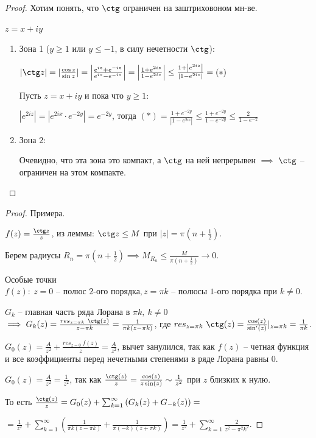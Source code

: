 \begin{proof}
    Хотим понять, что $\ctg$ ограничен на заштриховоном мн-ве.

    $z = x + iy$

    \begin{enumerate}
        \item {
            Зона 1 ($y \geq 1$ или $y \leq -1$, в силу нечетности $\ctg$):

            $|\ctg z| = |\frac{\cos z}{\sin z}| = \left|\frac{e^{iz} + e^{-iz}}{e^{iz} - e^{-iz}}\right| = \left| \frac{1 + e^{2iz}}{1 - e^{2iz}} \right| \leq  \frac{1 + \left|e^{2iz}\right|}{\left|1 - e^{2iz}\right|} = (*)$

            Пусть $z = x + iy$ и пока что $y \geq 1$:

            $|e^{2iz}| = |e^{2ix} \cdot e^{-2y}| = e^{-2y}$, тогда $(*) = \frac{1 + e^{-2y}}{|1 - e^{2iz}|} \leq \frac{1 + e^{-2y}}{1-e^{-2y}} \leq \frac{2}{1 - e^{-2}}$
        }
        \item {
            Зона 2:

            Очевидно, что эта зона это компакт, а $\ctg$ на ней непрерывен $\implies$ $\ctg$ -- ограничен на этом компакте.
        }
    \end{enumerate}
\end{proof}

\begin{proof}
    Примера.

    $f(z) = \frac{\ctg z}{z}$, из леммы: $\ctg z \leq M$ при $|z| = \pi (n + \frac{1}{2})$.

    Берем радиусы $R_n = \pi (n + \frac{1}{2}) \implies M_{R_n} \leq \frac{M}{\pi (n + \frac{1}{2})} \rightarrow 0$.

    Особые точки $f(z): \ z = 0 \text{ -- полюс 2-ого порядка}, z = \pi k \text{ -- полюсы 1-ого порядка при } k \neq 0$.

    $G_k$ -- главная часть ряда Лорана в $\pi k, \ k \neq 0$ $\implies G_k(z) = \frac{res_{z = \pi k} \ \ctg(z)}{z - \pi k} = \frac{1}{\pi k(z - \pi k)}$, где $res_{z = \pi k} \ \ctg(z) = \frac{\cos(z)}{\sin'(z)} |_{z = \pi k} = \frac{1}{\pi k}$.


    $G_0(z) = \frac{A}{z^2} + \frac{res_{z = 0} \ f(z)}{z} = \frac{A}{z^2}$, вычет занулился, так как $f(z)$ -- четная функция и все коэффициенты перед нечетными степенями в ряде Лорана равны $0$.

    $G_0(z) = \frac{A}{z^2} = \frac{1}{z^2}$, так как $\frac{\ctg(z)}{z} = \frac{\cos(z)}{z \sin(z)} \sim \frac{1}{z^2}$ при $z$ близких к нулю.

    То есть $\frac{\ctg(z)}{z} = G_0(z) + \sum_{k=1}^{\infty} \left(G_{k}(z) + G_{-k}(z)\right) =$

    $= \frac{1}{z^2} + \sum_{k=1}^{\infty} \left( \frac{1}{\pi k(z - \pi k)} + \frac{1}{\pi (-k) (z + \pi k)} \right) = \frac{1}{z^2} + \sum_{k=1}^{\infty} \frac{2}{z^2 - \pi^2 k^2}$.
\end{proof}


